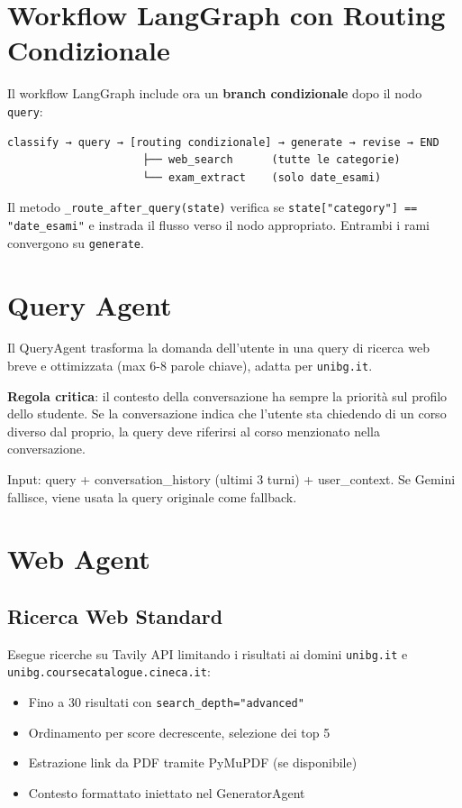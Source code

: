 \documentclass[a4paper,12pt]{report}
\begin{document}
\section{Workflow LangGraph con Routing Condizionale}

Il workflow LangGraph include ora un \textbf{branch condizionale} dopo il nodo \texttt{query}:

\begin{verbatim}
classify → query → [routing condizionale] → generate → revise → END
                     ├── web_search      (tutte le categorie)
                     └── exam_extract    (solo date_esami)
\end{verbatim}

Il metodo \texttt{\_route\_after\_query(state)} verifica se \texttt{state["category"] == "date\_esami"} e instrada il flusso verso il nodo appropriato. Entrambi i rami convergono su \texttt{generate}.

\section{Query Agent}

Il QueryAgent trasforma la domanda dell'utente in una query di ricerca web breve e ottimizzata (max 6-8 parole chiave), adatta per \texttt{unibg.it}.

\textbf{Regola critica}: il contesto della conversazione ha sempre la priorità sul profilo dello studente. Se la conversazione indica che l'utente sta chiedendo di un corso diverso dal proprio, la query deve riferirsi al corso menzionato nella conversazione.

Input: query + conversation\_history (ultimi 3 turni) + user\_context. Se Gemini fallisce, viene usata la query originale come fallback.

\section{Web Agent}

\subsection{Ricerca Web Standard}
Esegue ricerche su Tavily API limitando i risultati ai domini \texttt{unibg.it} e \texttt{unibg.coursecatalogue.cineca.it}:
\begin{itemize}
    \item Fino a 30 risultati con \texttt{search\_depth="advanced"}
    \item Ordinamento per score decrescente, selezione dei top 5
    \item Estrazione link da PDF tramite PyMuPDF (se disponibile)
    \item Contesto formattato iniettato nel GeneratorAgent
\end{itemize}
\end{document}
